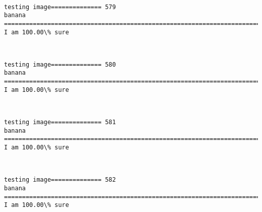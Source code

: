 \documentclass[11pt]{article}
\begin{document}
    \begin{center}
    \end{center}
    { \hspace*{\fill} \\}
    
    \begin{Verbatim}[commandchars=\\\{\}]
testing image============== 579
banana
============================================================================
I am 100.00\% sure

    \end{Verbatim}

    \begin{center}
    \end{center}
    { \hspace*{\fill} \\}
    
    \begin{Verbatim}[commandchars=\\\{\}]
testing image============== 580
banana
============================================================================
I am 100.00\% sure

    \end{Verbatim}

    \begin{center}
    \end{center}
    { \hspace*{\fill} \\}
    
    \begin{Verbatim}[commandchars=\\\{\}]
testing image============== 581
banana
============================================================================
I am 100.00\% sure

    \end{Verbatim}

    \begin{center}
    \end{center}
    { \hspace*{\fill} \\}
    
    \begin{Verbatim}[commandchars=\\\{\}]
testing image============== 582
banana
============================================================================
I am 100.00\% sure

    \end{Verbatim}
\end{document}
